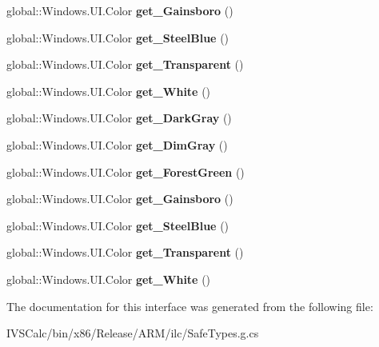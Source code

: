 \begin{DoxyCompactItemize}
global\+::\+Windows.\+U\+I.\+Color {\bfseries get\+\_\+\+Gainsboro} ()
\item 
\mbox{\label{interface_windows_1_1_u_i_1_1_i_colors_statics_a210c8445bedd3241983fb1bc4cfe050a}} 
global\+::\+Windows.\+U\+I.\+Color {\bfseries get\+\_\+\+Steel\+Blue} ()
\item 
\mbox{\label{interface_windows_1_1_u_i_1_1_i_colors_statics_a8d6675f108b15f0d9a646bdc0c88d0fd}} 
global\+::\+Windows.\+U\+I.\+Color {\bfseries get\+\_\+\+Transparent} ()
\item 
\mbox{\label{interface_windows_1_1_u_i_1_1_i_colors_statics_af103ebd073e0458fbb00b0f60145c1e5}} 
global\+::\+Windows.\+U\+I.\+Color {\bfseries get\+\_\+\+White} ()
\item 
\mbox{\label{interface_windows_1_1_u_i_1_1_i_colors_statics_a7881fc8328a2a78e233e768a2e6f0880}} 
global\+::\+Windows.\+U\+I.\+Color {\bfseries get\+\_\+\+Dark\+Gray} ()
\item 
\mbox{\label{interface_windows_1_1_u_i_1_1_i_colors_statics_a57a216be793e9b6baabf198a690082d5}} 
global\+::\+Windows.\+U\+I.\+Color {\bfseries get\+\_\+\+Dim\+Gray} ()
\item 
\mbox{\label{interface_windows_1_1_u_i_1_1_i_colors_statics_a3f27cb7bcd43c9c99b01b805fca5e8b7}} 
global\+::\+Windows.\+U\+I.\+Color {\bfseries get\+\_\+\+Forest\+Green} ()
\item 
\mbox{\label{interface_windows_1_1_u_i_1_1_i_colors_statics_a411827a3820423543c46de55db7fb69d}} 
global\+::\+Windows.\+U\+I.\+Color {\bfseries get\+\_\+\+Gainsboro} ()
\item 
\mbox{\label{interface_windows_1_1_u_i_1_1_i_colors_statics_a210c8445bedd3241983fb1bc4cfe050a}} 
global\+::\+Windows.\+U\+I.\+Color {\bfseries get\+\_\+\+Steel\+Blue} ()
\item 
\mbox{\label{interface_windows_1_1_u_i_1_1_i_colors_statics_a8d6675f108b15f0d9a646bdc0c88d0fd}} 
global\+::\+Windows.\+U\+I.\+Color {\bfseries get\+\_\+\+Transparent} ()
\item 
\mbox{\label{interface_windows_1_1_u_i_1_1_i_colors_statics_af103ebd073e0458fbb00b0f60145c1e5}} 
global\+::\+Windows.\+U\+I.\+Color {\bfseries get\+\_\+\+White} ()
\end{DoxyCompactItemize}


The documentation for this interface was generated from the following file\+:\begin{DoxyCompactItemize}
\item 
I\+V\+S\+Calc/bin/x86/\+Release/\+A\+R\+M/ilc/Safe\+Types.\+g.\+cs\end{DoxyCompactItemize}
